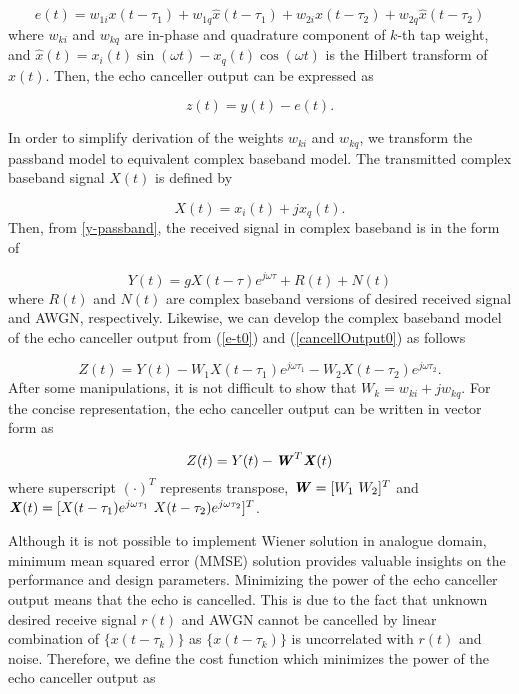 \documentclass[twocolumn]{IEEEtran}
\begin{document}
\begin{equation}\label{e-t0}
e(t)=w_{1i} x(t-\tau_1)+w_{1q} \hat{x} (t-\tau_1)+ w_{2i}
x(t-\tau_2)+w_{2q} \hat{x} (t-\tau_2)
\end{equation}
where $w_{ki}$ and $w_{kq}$ are in-phase and quadrature component of
$k$-th tap weight, and $\hat{x}(t)=x_i (t) \sin (\omega t) - x_q (t)
\cos (\omega t)$ is the Hilbert transform of $x(t)$. Then, the echo
canceller output can be expressed as

\begin{equation} \label{cancellOutput0}
z(t)=y(t) - e(t).
\end{equation}

In order to simplify derivation of the weights $w_{ki}$ and
$w_{kq}$, we transform the passband model to equivalent complex
baseband model. The transmitted complex baseband signal $X(t)$ is
defined by

\begin{equation}
X(t)=x_i (t) + j x_q (t).
\end{equation}
Then, from \eqref{y-passband}, the received signal in complex
baseband is in the form of

\begin{equation}
Y(t)=g X (t-\tau)e^{j\omega \tau} + R(t)+N(t)
\end{equation}
where $R(t)$ and $N(t)$ are complex baseband versions of desired
received signal and AWGN, respectively. Likewise, we can develop the
complex baseband model of the echo canceller output from
(\ref{e-t0}) and (\ref{cancellOutput0}) as follows

\begin{equation}
Z(t)=Y(t)-W_1 X (t-\tau_1)e^{j\omega \tau_1} -W_2 X
(t-\tau_2)e^{j\omega \tau_2}.
\end{equation}
After some manipulations, it is not difficult to show that
$W_k=w_{ki}+j w_{kq}$. For the concise representation, the echo
canceller output can be written in vector form as

\begin{equation}
Z(t)=Y(t)-\textbf{\textit{W}}^T \textbf{\textit{X}} (t)
\end{equation}
where superscript $(\cdot)^T$ represents transpose,
$\textbf{\textit{W}}= [ W_1~ W_2]^T$ and $\textbf{\textit{X}} (t)=[
X (t-\tau_1)e^{j\omega \tau_1}~ X (t-\tau_2)e^{j\omega \tau_2} ]^T$.

Although it is not possible to implement Wiener solution in analogue
domain, minimum mean squared error (MMSE) solution provides valuable
insights on the performance and design parameters. Minimizing the
power of the echo canceller output means that the echo is cancelled.
This is due to the fact that unknown desired receive signal $r(t)$
and AWGN cannot be cancelled by linear combination of
$\{x(t-\tau_k)\}$ as $\{x(t-\tau_k)\}$ is uncorrelated with $r(t)$
and noise. Therefore, we define the cost function which minimizes
the power of the echo canceller output as
\end{document}
